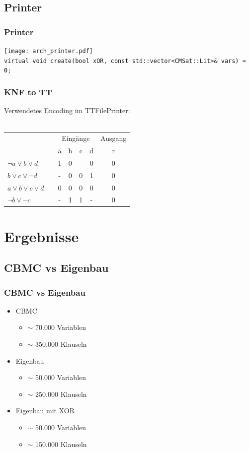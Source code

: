 \documentclass{beamer}
\begin{document}
\subsection{Printer}
  \begin{frame}
    \frametitle{Printer}
    \texttt{[image: arch\_printer.pdf]}\\
    \texttt{virtual void create(bool xOR, const std::vector{\textless}CMSat::Lit{\textgreater}\& vars) = 0;}
  \end{frame}
  \begin{frame}
    \frametitle{KNF to TT}
    Verwendetes Encoding im TTFilePrinter:\\
    ~\\
    \begin{tabular}{lp{2cm}|cccc|c|}
       &  & \multicolumn{4}{c|}{Eingänge} & Ausgang\\
       &  & a & b & c & d & r \\
      \cline{3-7}
      $ \neg a \vee b \vee d $   &  & 1 & 0 & - & 0 & 0 \\
      $ b \vee c \vee \neg d $   &  & - & 0 & 0 & 1 & 0 \\
      $ a \vee b \vee c \vee d $ &  & 0 & 0 & 0 & 0 & 0 \\
      $ \neg b \vee \neg c $     &  & - & 1 & 1 & - & 0
    \end{tabular}
  \end{frame}
\section{Ergebnisse}
\subsection{CBMC vs Eigenbau}
  \begin{frame}
    \frametitle{CBMC vs Eigenbau}
    \begin{itemize}
      \item CBMC
      \begin{itemize}
        \item $ \sim $ 70.000 Variablen
        \item $ \sim $ 350.000 Klauseln
      \end{itemize}
      \item Eigenbau
      \begin{itemize}
        \item $ \sim $ 50.000 Variablen
        \item $ \sim $ 250.000 Klauseln
      \end{itemize}
      \item Eigenbau mit XOR
      \begin{itemize}
        \item $ \sim $ 50.000 Variablen
        \item $ \sim $ 150.000 Klauseln
      \end{itemize}
    \end{itemize}
  \end{frame}
\end{document}
